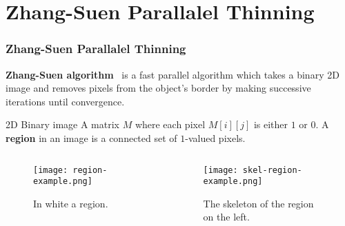 \section{Zhang-Suen Parallalel Thinning}
\begin{frame}
  \frametitle{Zhang-Suen Parallalel Thinning}
  \textbf{Zhang-Suen algorithm}~\cite{zha84} is a fast parallel algorithm which takes a binary 2D image and removes pixels from the object's border by making successive iterations until convergence.
  \begin{block}{2D Binary image}
    A matrix $M$ where each pixel $M[i][j]$ is either $1$ or $0$. A \textbf{region} in an image is a connected set of $1$-valued pixels.
  \end{block}
  \begin{columns}
    \begin{column}{0.5\textwidth}
      \begin{figure}
        \centering
        \texttt{[image: region-example.png]}
        \caption{In white a region.}
      \end{figure}
    \end{column}
    \begin{column}{0.5\textwidth}
      \begin{figure}
        \centering
        \texttt{[image: skel-region-example.png]}
        \caption{The skeleton of the region on the left.}
      \end{figure}
    \end{column}
  \end{columns}
\end{frame}

